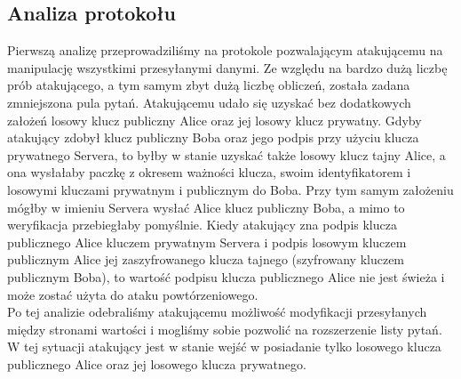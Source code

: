 \documentclass[11pt]{article}
\begin{document}
\clearpage
 
\subsection{Analiza protokołu}
Pierwszą analizę przeprowadziliśmy na protokole pozwalającym atakującemu na manipulację wszystkimi przesyłanymi danymi. Ze względu na bardzo dużą liczbę prób atakującego, a tym samym zbyt dużą liczbę obliczeń, została zadana zmniejszona pula pytań. Atakującemu udało się uzyskać bez dodatkowych założeń losowy klucz publiczny Alice oraz jej losowy klucz prywatny.
Gdyby atakujący zdobył klucz publiczny Boba oraz jego podpis przy użyciu klucza prywatnego Servera, to byłby w stanie uzyskać także losowy klucz tajny Alice, a ona wysłałaby paczkę z okresem ważności klucza, swoim identyfikatorem i losowymi kluczami prywatnym i publicznym do Boba. Przy tym samym założeniu mógłby w imieniu Servera wysłać Alice klucz publiczny Boba, a mimo to weryfikacja przebiegłaby pomyślnie. Kiedy atakujący zna podpis klucza publicznego Alice kluczem prywatnym Servera i podpis losowym kluczem publicznym Alice jej zaszyfrowanego klucza tajnego (szyfrowany kluczem publicznym Boba), to wartość podpisu klucza publicznego Alice nie jest świeża i może zostać użyta do ataku powtórzeniowego.\\
Po tej analizie odebraliśmy atakującemu możliwość modyfikacji przesyłanych między stronami wartości i mogliśmy sobie pozwolić na rozszerzenie listy pytań. W tej sytuacji atakujący jest w stanie wejść w posiadanie tylko losowego klucza publicznego Alice oraz jej losowego klucza prywatnego.
\\\\
\end{document}
